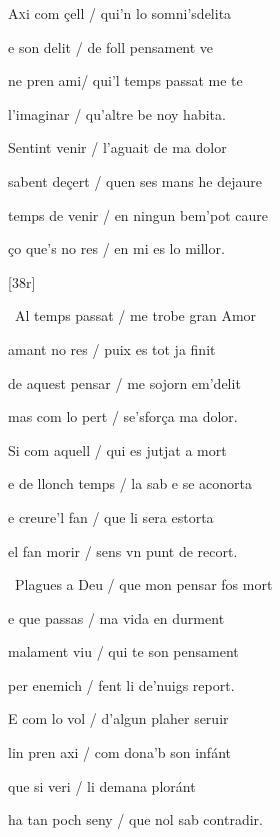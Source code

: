 




\begin{estrofa}

 A\textsc{x}i com \c{c}ell / qui'n lo somni'sdelita

 e son delit / de foll pensament ve

 ne pren ami/ qui'l temps passat me te

 l'imaginar / qu'altre be noy habita.

 Sentint venir / l'aguait de ma dolor

 sabent de\c{c}ert / quen ses mans he dejaure

 temps de venir / en ningun bem'pot caure

 \c{c}o que's no res / en mi es lo millor.

\end{estrofa}


[38r]
\begin{estrofa}

 \textparagraph\  Al temps passat / me trobe gran Amor

 amant no res / puix es tot ja finit

 de aquest pensar / me sojorn em'delit

 mas com lo pert / se'sfor\c{c}a ma dolor.

 Si com aquell / qui es jutjat a mort

 e de llonch temps / la sab e se aconorta

 e creure'l fan / que li sera estorta

 el fan morir / sens vn punt de recort.

\end{estrofa}



\begin{estrofa}

 \textparagraph\  Plagues a Deu / que mon pensar fos mort

 e que passas / ma vida en durment

 malament viu / qui te son pensament

 per enemich / fent li de'nuigs report.

 E com lo vol / d'algun plaher seruir

 lin pren axi / com dona'b son inf\'{a}nt

 que si veri / li demana plor\'{a}nt

 ha tan poch seny / que nol sab contradir.

\end{estrofa}



